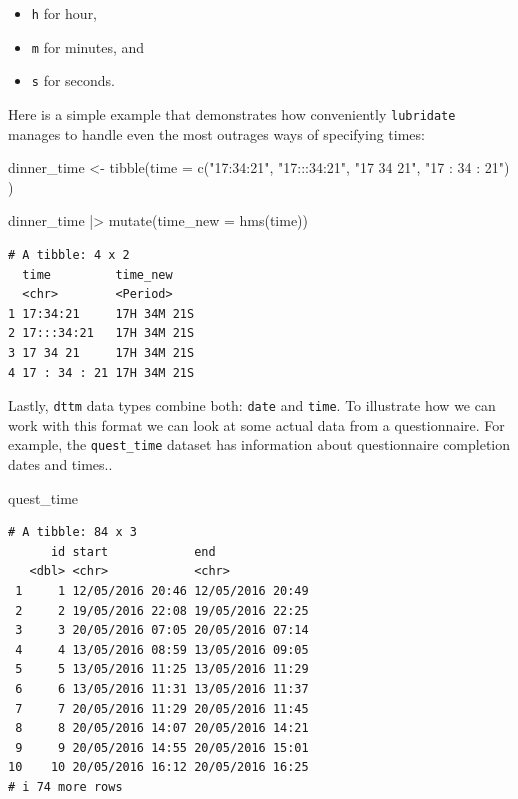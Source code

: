 \documentclass[
  letterpaper,
  DIV=11,
  numbers=noendperiod]{scrreprt}
\newenvironment{Shaded}{\begin{snugshade}}{\end{snugshade}}
\newcommand{\AttributeTok}[1]{\textcolor[rgb]{0.40,0.45,0.13}{#1}}
\newcommand{\FunctionTok}[1]{\textcolor[rgb]{0.28,0.35,0.67}{#1}}
\newcommand{\NormalTok}[1]{\textcolor[rgb]{0.00,0.23,0.31}{#1}}
\newcommand{\OtherTok}[1]{\textcolor[rgb]{0.00,0.23,0.31}{#1}}
\newcommand{\SpecialCharTok}[1]{\textcolor[rgb]{0.37,0.37,0.37}{#1}}
\newcommand{\StringTok}[1]{\textcolor[rgb]{0.13,0.47,0.30}{#1}}
\begin{document}
\begin{itemize}
\item
  \texttt{h} for hour,
\item
  \texttt{m} for minutes, and
\item
  \texttt{s} for seconds.
\end{itemize}

Here is a simple example that demonstrates how conveniently
\texttt{lubridate} manages to handle even the most outrages ways of
specifying times:

\begin{Shaded}
\begin{Highlighting}[]
\NormalTok{dinner\_time }\OtherTok{\textless{}{-}} \FunctionTok{tibble}\NormalTok{(}\AttributeTok{time =} \FunctionTok{c}\NormalTok{(}\StringTok{"17:34:21"}\NormalTok{,}
                               \StringTok{"17:::34:21"}\NormalTok{,}
                               \StringTok{"17 34 21"}\NormalTok{,}
                               \StringTok{"17 : 34 : 21"}\NormalTok{)}
\NormalTok{                      )}

\NormalTok{dinner\_time }\SpecialCharTok{|\textgreater{}} \FunctionTok{mutate}\NormalTok{(}\AttributeTok{time\_new =} \FunctionTok{hms}\NormalTok{(time))}
\end{Highlighting}
\end{Shaded}

\begin{verbatim}
# A tibble: 4 x 2
  time         time_new   
  <chr>        <Period>   
1 17:34:21     17H 34M 21S
2 17:::34:21   17H 34M 21S
3 17 34 21     17H 34M 21S
4 17 : 34 : 21 17H 34M 21S
\end{verbatim}

Lastly, \texttt{dttm} data types combine both: \texttt{date} and
\texttt{time}. To illustrate how we can work with this format we can
look at some actual data from a questionnaire. For example, the
\texttt{\textasciigrave{}quest\_time\textasciigrave{}} dataset has
information about questionnaire completion dates and times..

\begin{Shaded}
\begin{Highlighting}[]
\NormalTok{quest\_time}
\end{Highlighting}
\end{Shaded}

\begin{verbatim}
# A tibble: 84 x 3
      id start            end             
   <dbl> <chr>            <chr>           
 1     1 12/05/2016 20:46 12/05/2016 20:49
 2     2 19/05/2016 22:08 19/05/2016 22:25
 3     3 20/05/2016 07:05 20/05/2016 07:14
 4     4 13/05/2016 08:59 13/05/2016 09:05
 5     5 13/05/2016 11:25 13/05/2016 11:29
 6     6 13/05/2016 11:31 13/05/2016 11:37
 7     7 20/05/2016 11:29 20/05/2016 11:45
 8     8 20/05/2016 14:07 20/05/2016 14:21
 9     9 20/05/2016 14:55 20/05/2016 15:01
10    10 20/05/2016 16:12 20/05/2016 16:25
# i 74 more rows
\end{verbatim}
\end{document}
